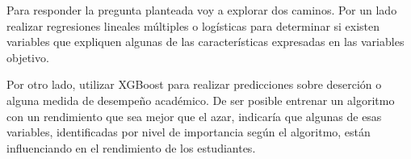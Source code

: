 \documentclass[a4paper,11pt]{article}
\begin{document}
Para responder la pregunta planteada voy a explorar dos caminos. Por un lado realizar regresiones lineales múltiples o logísticas para determinar si existen variables que expliquen algunas de las características expresadas en las variables objetivo.

Por otro lado, utilizar XGBoost para realizar predicciones sobre deserción o alguna medida de desempeño académico. De ser posible entrenar un algoritmo con un rendimiento que sea mejor que el azar, indicaría que algunas de esas variables, identificadas por nivel de importancia según el algoritmo, están influenciando en el rendimiento de los estudiantes.


\printbibliography
\end{document}
